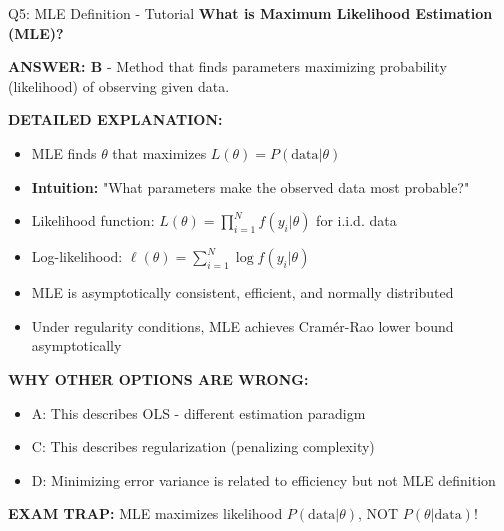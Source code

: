\documentclass[8pt]{beamer}
\begin{document}
	\begin{frame}{Q5: MLE Definition - Tutorial}
		\fontsize{6.5}{7.5}\selectfont
		\textbf{What is Maximum Likelihood Estimation (MLE)?}
		
		\vspace{0.05cm}
		\textcolor{myblue}{\textbf{ANSWER: B}} - Method that finds parameters maximizing probability (likelihood) of observing given data.
		
		\vspace{0.05cm}
		\textbf{DETAILED EXPLANATION:}
		\begin{itemize}
			\item MLE finds $\theta$ that maximizes $L(\theta) = P(\text{data} | \theta)$
			\item \textbf{Intuition:} "What parameters make the observed data most probable?"
			\item Likelihood function: $L(\theta) = \prod_{i=1}^N f(y_i | \theta)$ for i.i.d. data
			\item Log-likelihood: $\ell(\theta) = \sum_{i=1}^N \log f(y_i | \theta)$
			\item MLE is asymptotically consistent, efficient, and normally distributed
			\item Under regularity conditions, MLE achieves Cramér-Rao lower bound asymptotically
		\end{itemize}
		
		\vspace{0.05cm}
		\textcolor{myred}{\textbf{WHY OTHER OPTIONS ARE WRONG:}}
		\begin{itemize}
			\item \textcolor{myred}{A:} This describes OLS - different estimation paradigm
			\item \textcolor{myred}{C:} This describes regularization (penalizing complexity)
			\item \textcolor{myred}{D:} Minimizing error variance is related to efficiency but not MLE definition
		\end{itemize}
		
		\textcolor{myred}{\textbf{EXAM TRAP:}} MLE maximizes \textcolor{myblue}{likelihood} $P(\text{data}|\theta)$, NOT $P(\theta|\text{data})$!
	\end{frame}
	
\end{document}
